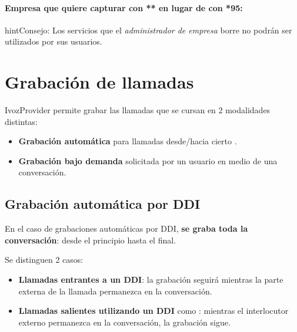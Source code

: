 \documentclass[letterpaper,10pt,spanish]{sphinxmanual}
\begin{document}
\paragraph{Empresa que quiere capturar con ** en lugar de con *95:}

\noindent{}

\begin{notice}{hint}{Consejo:}
Los servicios que el \emph{administrador de empresa} borre no podrán ser utilizados por sus usuarios.
\end{notice}


\section{Grabación de llamadas}
\label{pbx_features/call_recording:grabacion-de-llamadas}\label{pbx_features/call_recording::doc}\label{pbx_features/call_recording:call-recordings}
IvozProvider permite grabar las llamadas que se cursan en 2 modalidades distintas:
\begin{itemize}
\item {} 
\textbf{Grabación automática} para llamadas desde/hacia cierto {\hyperref[pbx_features/external_ddis:external\string-ddis]{}}.

\item {} 
\textbf{Grabación bajo demanda} solicitada por un usuario en medio de una conversación.

\end{itemize}


\subsection{Grabación automática por DDI}
\label{pbx_features/call_recording:grabacion-automatica-por-ddi}
En el caso de grabaciones automáticas por DDI, \textbf{se graba toda la conversación}: desde el principio hasta el final.

Se distinguen 2 casos:
\begin{itemize}
\item {} 
\textbf{Llamadas entrantes a un DDI}: la grabación seguirá mientras la parte externa de la llamada permanezca en la conversación.

\item {} 
\textbf{Llamadas salientes utilizando un DDI} como {\hyperref[pbx_features/external_ddis:external\string-ddis]{}}: mientras el interlocutor externo permanezca en la conversación, la grabación sigue.

\end{itemize}
\end{document}
